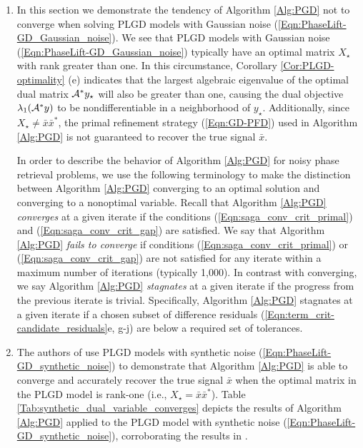 \begin{enumerate}


\item



In this section we demonstrate the tendency of Algorithm \ref{Alg:PGD} not to converge when solving PLGD models with Gaussian noise (\ref{Eqn:PhaseLift-GD_Gaussian_noise}).  
We see that PLGD models with Gaussian noise (\ref{Eqn:PhaseLift-GD_Gaussian_noise}) typically have an optimal matrix $X_\star$ with rank greater than one.  
In this circumstance, Corollary \ref{Cor:PLGD-optimality} (e) indicates that the largest algebraic eigenvalue of the optimal dual matrix ${\mathcal A}^*y_\star$ will also be greater than one, causing the dual objective $\lambda_1({\mathcal A}^*y)$ to be nondifferentiable in a neighborhood of $y_\star$.  
Additionally, since $X_\star \neq \bar{x}\bar{x}^*$, the primal refinement strategy (\ref{Eqn:GD-PFD}) used in Algorithm \ref{Alg:PGD} is not guaranteed to recover the true signal $\bar{x}$.


In order to describe the behavior of Algorithm \ref{Alg:PGD} for noisy phase retrieval problems, we use the following terminology to make the distinction between Algorithm \ref{Alg:PGD} converging to an optimal solution and converging to a nonoptimal variable.
Recall that Algorithm \ref{Alg:PGD} \textit{converges} at a given iterate if the conditions (\ref{Eqn:saga_conv_crit_primal}) and (\ref{Eqn:saga_conv_crit_gap}) are satisfied.  
We say that Algorithm \ref{Alg:PGD} \textit{fails to converge} if conditions (\ref{Eqn:saga_conv_crit_primal}) or (\ref{Eqn:saga_conv_crit_gap}) are not satisfied for any iterate within a maximum number of iterations (typically 1,000).
In contrast with converging, we say Algorithm \ref{Alg:PGD} \textit{stagnates} at a given iterate if the progress from the previous iterate is trivial.  
Specifically, Algorithm \ref{Alg:PGD} stagnates at a given iterate if a chosen subset of difference residuals (\ref{Eqn:term_crit-candidate_residuals}e, g-j) are below a required set of tolerances.









\item

The authors of \cite{DBLP:journals/siamsc/FriedlanderM16} use PLGD models with synthetic noise (\ref{Eqn:PhaseLift-GD_synthetic_noise}) to demonstrate that Algorithm \ref{Alg:PGD} is able to converge and accurately recover the true signal $\bar{x}$ when the optimal matrix in the PLGD model is rank-one (i.e., $X_\star = \bar{x} \bar{x}^*$).  
Table \ref{Tab:synthetic_dual_variable_converges} depicts the results of Algorithm \ref{Alg:PGD} applied to the PLGD model with synthetic noise (\ref{Eqn:PhaseLift-GD_synthetic_noise}), corroborating the results in \cite[Section 5.1.2]{DBLP:journals/siamsc/FriedlanderM16}.


\end{enumerate}
